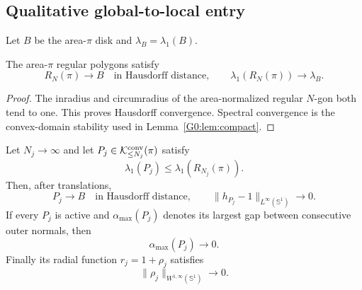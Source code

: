 \subsection{Qualitative global-to-local entry}

Let $B$ be the area-$\pi$ disk and
$\lambda_B=\lambda_1(B)$.

\begin{lemma}
\label{G0:lem:regular-limit}
The area-$\pi$ regular polygons satisfy
\begin{equation}\label{G0:eq:regular-limit}
 R_N(\pi)\longrightarrow B\quad\text{in Hausdorff distance},
 \qquad
 \lambda_1(R_N(\pi))\longrightarrow\lambda_B.
\end{equation}
\end{lemma}

\begin{proof}
The inradius and circumradius of the area-normalized regular $N$-gon both
tend to one.  This proves Hausdorff convergence.  Spectral convergence is
the convex-domain stability used in Lemma~\ref{G0:lem:compact}.
\end{proof}

\begin{lemma}
\label{G0:lem:entry}
Let $N_j\to\infty$ and let
$P_j\in\mathcal K_{\le N_j}^{\rm conv}(\pi)$ satisfy
\begin{equation}\label{G0:eq:competing}
 \lambda_1(P_j)\le\lambda_1(R_{N_j}(\pi)).
\end{equation}
Then, after translations,
\begin{equation}\label{G0:eq:support-limit}
 P_j\longrightarrow B\quad\text{in Hausdorff distance},\qquad
 \|h_{P_j}-1\|_{L^\infty(\mathbb S^1)}\longrightarrow0.
\end{equation}
If every $P_j$ is active and $\alpha_{\max}(P_j)$ denotes its largest
gap between consecutive outer normals, then
\begin{equation}\label{G0:eq:angle-limit}
 \alpha_{\max}(P_j)\longrightarrow0.
\end{equation}
Finally its radial function $r_j=1+\rho_j$ satisfies
\begin{equation}\label{G0:eq:radial-limit}
 \|\rho_j\|_{W^{1,\infty}(\mathbb S^1)}\longrightarrow0.
\end{equation}
\end{lemma}


